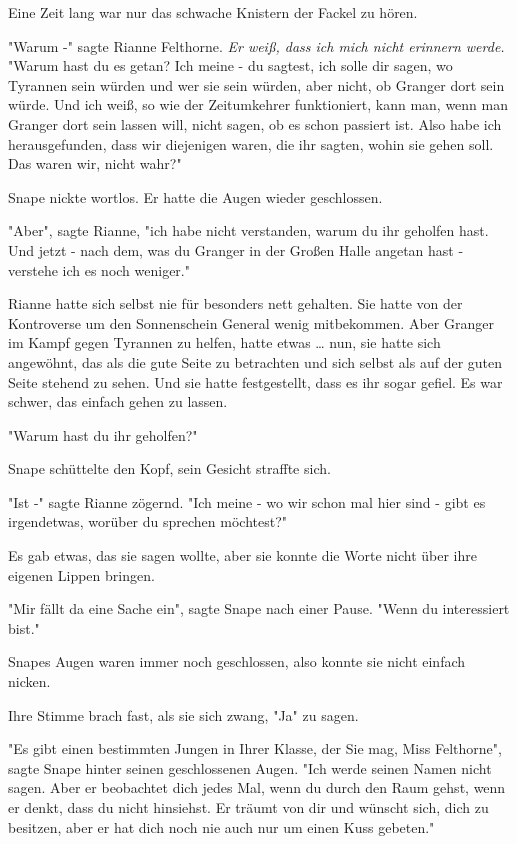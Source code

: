 {Eine Zeit lang war nur das schwache Knistern der Fackel zu hören.

"Warum -" sagte Rianne Felthorne. \emph{Er weiß, dass ich mich nicht erinnern werde.} "Warum hast du es getan? Ich meine - du sagtest, ich solle dir sagen, wo Tyrannen sein würden und wer sie sein würden, aber nicht, ob Granger dort sein würde. Und ich weiß, so wie der Zeitumkehrer funktioniert, kann man, wenn man Granger dort sein lassen will, nicht sagen, ob es schon passiert ist. Also habe ich herausgefunden, dass wir diejenigen waren, die ihr sagten, wohin sie gehen soll. Das waren wir, nicht wahr?"

Snape nickte wortlos. Er hatte die Augen wieder geschlossen.

"Aber", sagte Rianne, "ich habe nicht verstanden, warum du ihr geholfen hast. Und jetzt - nach dem, was du Granger in der Großen Halle angetan hast - verstehe ich es noch weniger."

Rianne hatte sich selbst nie für besonders nett gehalten. Sie hatte von der Kontroverse um den Sonnenschein General wenig mitbekommen. Aber Granger im Kampf gegen Tyrannen zu helfen, hatte etwas … nun, sie hatte sich angewöhnt, das als die gute Seite zu betrachten und sich selbst als auf der guten Seite stehend zu sehen. Und sie hatte festgestellt, dass es ihr sogar gefiel. Es war schwer, das einfach gehen zu lassen.

"Warum hast du ihr geholfen?"

Snape schüttelte den Kopf, sein Gesicht straffte sich.

"Ist -" sagte Rianne zögernd. "Ich meine - wo wir schon mal hier sind - gibt es irgendetwas, worüber du sprechen möchtest?"

Es gab etwas, das sie sagen wollte, aber sie konnte die Worte nicht über ihre eigenen Lippen bringen.

"Mir fällt da eine Sache ein", sagte Snape nach einer Pause. "Wenn du interessiert bist."

Snapes Augen waren immer noch geschlossen, also konnte sie nicht einfach nicken.

Ihre Stimme brach fast, als sie sich zwang, "Ja" zu sagen.

"Es gibt einen bestimmten Jungen in Ihrer Klasse, der Sie mag, Miss Felthorne", sagte Snape hinter seinen geschlossenen Augen. "Ich werde seinen Namen nicht sagen. Aber er beobachtet dich jedes Mal, wenn du durch den Raum gehst, wenn er denkt, dass du nicht hinsiehst. Er träumt von dir und wünscht sich, dich zu besitzen, aber er hat dich noch nie auch nur um einen Kuss gebeten."

}
